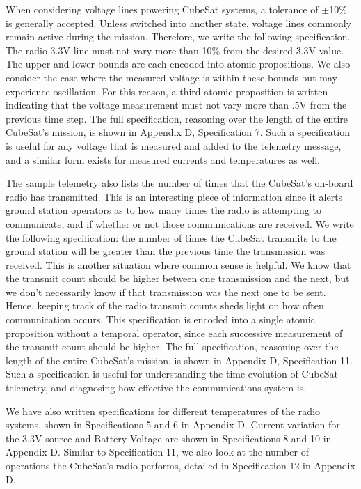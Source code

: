 \documentclass[conf]{new-aiaa}
\begin{document}
When considering voltage lines powering CubeSat systems, a tolerance of $\pm$10$\%$ is generally accepted. Unless switched into another state, voltage lines commonly remain active during the mission. Therefore, we write the following specification. The radio 3.3V line must not vary more than 10$\%$ from the desired 3.3V value. The upper and lower bounds are each encoded into atomic propositions. We also consider the case where the measured voltage is within these bounds but may experience oscillation. For this reason, a third atomic proposition is written indicating that the voltage measurement must not vary more than .5V from the previous time step. The full specification, reasoning over the length of the entire CubeSat's mission, is shown in Appendix D, Specification 7. Such a specification is useful for any voltage that is measured and added to the telemetry message, and a similar form exists for measured currents and temperatures as well.

The sample telemetry also lists the number of times that the CubeSat's on-board radio has transmitted. This is an interesting piece of information since it alerts ground station operators as to how many times the radio is attempting to communicate, and if whether or not those communications are received. We write the following specification: the number of times the CubeSat transmits to the ground station will be greater than the previous time the transmission was received. This is another situation where common sense is helpful. We know that the transmit count should be higher between one transmission and the next, but we don't necessarily know if that transmission was the next one to be sent. Hence, keeping track of the radio transmit counts sheds light on how often communication occurs. This specification is encoded into a single atomic proposition without a temporal operator, since each successive measurement of the transmit count should be higher. The full specification, reasoning over the length of the entire CubeSat's mission, is shown in Appendix D, Specification 11. Such a specification is useful for understanding the time evolution of CubeSat telemetry, and diagnosing how effective the communications system is.

We have also written specifications for different temperatures of the radio systems, shown in Specifications 5 and 6 in Appendix D. Current variation for the 3.3V source and Battery Voltage are shown in Specifications 8 and 10 in Appendix D. Similar to Specification 11, we also look at the number of operations the CubeSat's radio performs, detailed in Specification 12 in Appendix D.
\end{document}

